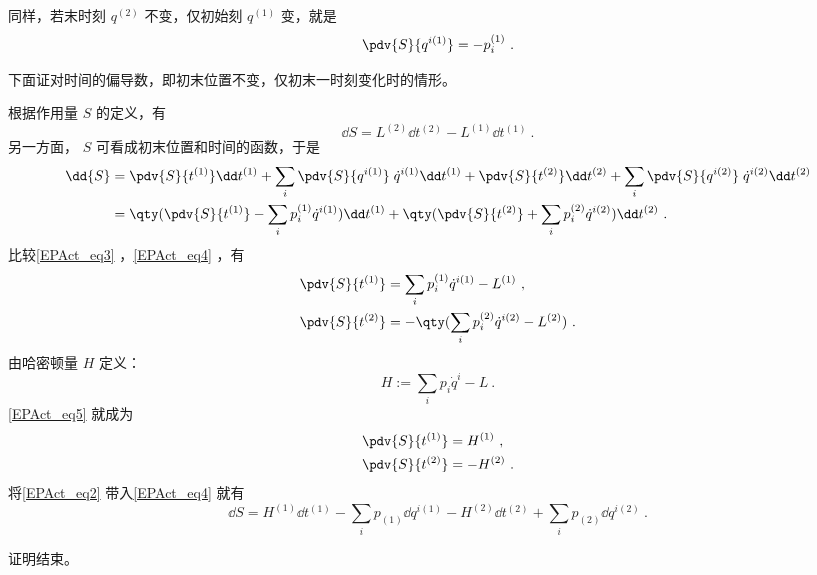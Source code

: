同样，若末时刻 $q^{(2)}$ 不变，仅初始刻 $q^{(1)}$ 变，就是
\begin{equation}
\pdv{S}{{q}^{i (1)}}=-p_i^{(1)}~.
\end{equation}

下面证对时间的偏导数，即初末位置不变，仅初末一时刻变化时的情形。

根据作用量 $S$ 的定义，有
\begin{equation}\label{EPAct_eq3}
\dd{S}=L^{(2)}\dd t^{(2)}-L^{(1)}\dd t^{(1)}~.
\end{equation}
另一方面， $S$ 可看成初末位置和时间的函数，于是
\begin{equation}\label{EPAct_eq4}
\begin{aligned}
\dd{S}&=\pdv{S}{t^{(1)}}\dd t^{(1)}+\sum_i\pdv{S}{{q}^{i (1)}}\;{\dot q}^{i (1)}\dd t^{(1)}+\pdv{S}{t^{(2)}}\dd t^{(2)}+\sum_i\pdv{S}{{q}^{i (2)}}\; {\dot q}^{i (2)}\dd t^{(2)} \\
&=\qty(\pdv{S}{t^{(1)}}-\sum_i p_i^{(1)} {\dot q}^{i (1)})\dd t^{(1)}+\qty(\pdv{S}{t^{(2)}}+\sum_i p_i^{(2)}{\dot q}^{i (2)})\dd t^{(2)}~.
\end{aligned}
\end{equation}
比较\autoref{EPAct_eq3} ，\autoref{EPAct_eq4} ，有
\begin{equation}\label{EPAct_eq5}
\begin{aligned}
\pdv{S}{t^{(1)}}&=\sum_i p_i^{(1)}{\dot q}^{i (1)}-L^{(1)}~,\\
\pdv{S}{t^{(2)}}&=-\qty(\sum_i p_i^{(2)}{\dot q}^{i (2)}-L^{(2)})~.
\end{aligned}
\end{equation}
由哈密顿量 $H$ 定义：
\begin{equation}
H:=\sum_i p_i {\dot q^i}-L~.
\end{equation}
\autoref{EPAct_eq5} 就成为
\begin{equation}\label{EPAct_eq2}
\begin{aligned}
\pdv{S}{t^{(1)}}&=H^{(1)}~,\\
\pdv{S}{t^{(2)}}&=-H^{(2)}~.
\end{aligned}
\end{equation}
将\autoref{EPAct_eq2} 带入\autoref{EPAct_eq4} 就有
\begin{equation}
\dd{S}=H^{(1)}\dd t^{(1)}-\sum_ip_{(1)}\dd {q}^{i (1)}-H^{(2)}\dd t^{(2)}+\sum_i p_{(2)}\dd {q}^{i (2)}~.
\end{equation}

证明结束。
